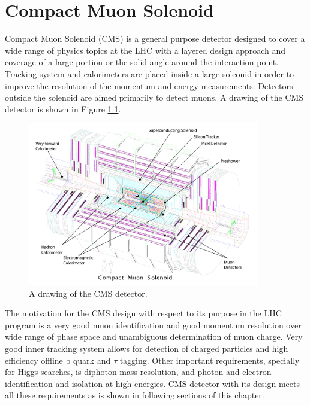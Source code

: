 \chapter{Compact Muon Solenoid} %

\label{Chapter4} %


Compact Muon Solenoid (CMS) is a general purpose detector designed to cover a wide range of physics topics at the LHC with a layered design approach and coverage of a large portion or the solid angle around the interaction point. Tracking system and calorimeters are placed inside a large soleonid in order to improve the resolution of the momentum and energy measurements. Detectors outside the solenoid are aimed primarily to detect muons. A drawing of the CMS detector is shown in Figure \ref{fig:CMS}. 
\begin{figure}[htbp]
	\centering
		\includegraphics[width=0.9\textwidth]{Figures/CMS.pdf}
	\caption[CMS detector]{A drawing of the CMS detector. \cite{Chatrchyan:2008aa}}
	\label{fig:CMS}
\end{figure}
\par The motivation for the CMS design with respect to its purpose in the LHC program is a very good muon identification and good momentum resolution over wide range of phase space and unambiguous determination of muon charge. Very good inner tracking system allows for detection of charged particles and high efficiency offline b quark and $\tau$ tagging. Other important requirements, specially for Higgs searches, is diphoton mass resolution, and photon and electron identification and isolation at high energies. 
CMS detector with its design meets all these requirements as is shown in following sections of this chapter. 


